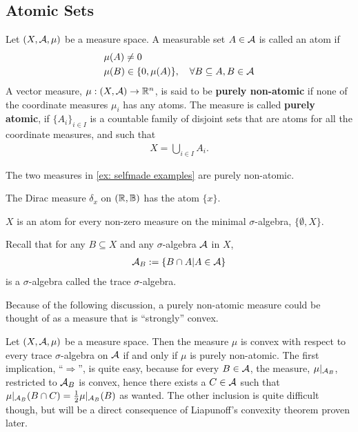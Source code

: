 \documentclass[../../main.tex]{subfiles}
\begin{document}

\subsection{Atomic Sets}

\begin{definition}
Let $(X, \mathcal{A}, \mu)$ be a measure space. A measurable set $A\in \mathcal{A}$ is called an atom if
\begin{align*}
	&\mu(A)\neq 0 \\
	&\mu(B) \in \{0, \mu(A)\}, \quad \forall B\subseteq A, B\in \mathcal{A}
\end{align*}
A vector measure, $\mu:(X,\mathcal{A})\to \mathbb{R}^{n}$, is said to be \textbf{purely non-atomic} if none of the coordinate measures $\mu_{i}$ has any atoms. The measure is called \textbf{purely atomic}, if $\{A_{i}\}_{i\in I}$ is a countable family of disjoint sets that are atoms for all the coordinate measures, and such that
\begin{align*}
	X=\bigcup_{i\in I}A_{i}.
\end{align*}
\end{definition}

\begin{example}
The two measures in \cref{ex: selfmade examples} are purely non-atomic.

The Dirac measure $\delta_{x}$ on $(\mathbb{R}, \mathbb{B})$ has the atom $\{x\}$.

$X$ is an atom for every non-zero measure on the minimal $\sigma$-algebra, $\{\emptyset, X\}$.
\end{example}

Recall that for any $B\subseteq X$ and any $\sigma$-algebra $\mathcal{A}$ in $X$,
\begin{align*}
	\mathcal{A}_{B}:=\{B\cap A|A\in \mathcal{A}\}
\end{align*}
is a $\sigma$-algebra called the trace $\sigma$-algebra.

Because of the following discussion, a purely non-atomic measure could be thought of as a measure that is ``strongly'' convex.

Let $(X, \mathcal{A}, \mu)$ be a measure space. Then the measure $\mu$ is convex with respect to every trace $\sigma$-algebra on $\mathcal{A}$ if and only if $\mu$ is purely non-atomic. The first implication, ``$\Rightarrow$'', is quite easy, because for every $B\in \mathcal{A}$, the measure, $\mu|_{\mathcal{A}_{B}}$, restricted to $\mathcal{A}_{B}$ is convex, hence there exists a $C\in \mathcal{A}$ such that $\mu|_{\mathcal{A}_{B}}(B\cap C)=\frac{1}{2}\mu|_{\mathcal{A}_{B}}(B)$ as wanted. The other inclusion is quite difficult though, but will be a direct consequence of Liapunoff's convexity theorem proven later.
\end{document}
